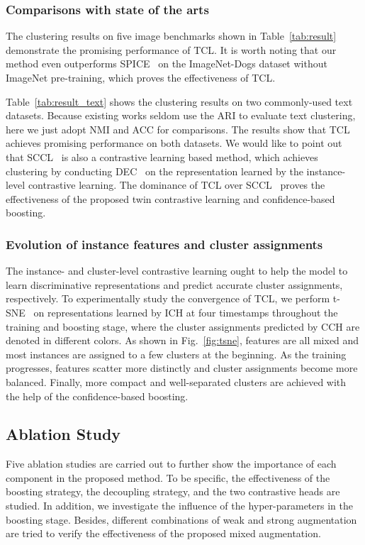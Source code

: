 \subsubsection{Comparisons with state of the arts}

The clustering results on five image benchmarks shown in Table~\ref{tab:result} demonstrate the promising performance of TCL. It is worth noting that our method even outperforms SPICE~\citep{SPICE} on the ImageNet-Dogs dataset without ImageNet pre-training, which proves the effectiveness of TCL.

Table~\ref{tab:result_text} shows the clustering results on two commonly-used text datasets. Because existing works seldom use the ARI to evaluate text clustering, here we just adopt NMI and ACC for comparisons. The results show that TCL achieves promising performance on both datasets. We would like to point out that SCCL~\citep{SCCL} is also a contrastive learning based method, which achieves clustering by conducting DEC~\citep{DEC} on the representation learned by the instance-level contrastive learning. The dominance of TCL over SCCL~\citep{SCCL} proves the effectiveness of the proposed twin contrastive learning and confidence-based boosting.

\subsubsection{Evolution of instance features and cluster assignments}

The instance- and cluster-level contrastive learning ought to help the model to learn discriminative representations and predict accurate cluster assignments, respectively. To experimentally study the convergence of TCL, we perform t-SNE~\citep{tSNE} on representations learned by ICH at four timestamps throughout the training and boosting stage, where the cluster assignments predicted by CCH are denoted in different colors. As shown in Fig.~\ref{fig:tsne}, features are all mixed and most instances are assigned to a few clusters at the beginning. As the training progresses, features scatter more distinctly and cluster assignments become more balanced. Finally, more compact and well-separated clusters are achieved with the help of the confidence-based boosting.

\subsection{Ablation Study}

Five ablation studies are carried out to further show the importance of each component in the proposed method. To be specific, the effectiveness of the boosting strategy, the decoupling strategy, and the two contrastive heads are studied. In addition, we investigate the influence of the hyper-parameters in the boosting stage. Besides, different combinations of weak and strong augmentation are tried to verify the effectiveness of the proposed mixed augmentation.


